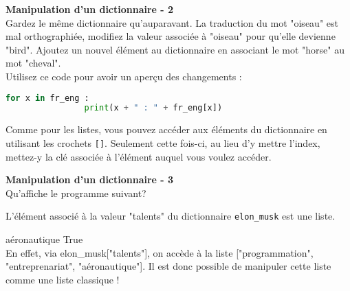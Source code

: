     \begin{Exercice}[5 minutes] \textbf{Manipulation d'un dictionnaire - 2}\\
       Gardez le même dictionnaire qu'auparavant. La traduction du mot "oiseau" est mal orthographiée, modifiez la valeur associée à "oiseau" pour qu'elle devienne "bird". Ajoutez un nouvel élément au dictionnaire en associant le mot "horse" au mot "cheval". \\
       
       Utilisez ce code pour avoir un aperçu des changements : \\
       
       \begin{lstlisting}[language=Python]
            for x in fr_eng :
    			print(x + " : " + fr_eng[x])   \end{lstlisting}
    
        \begin{conseil}
            Comme pour les listes, vous pouvez accéder aux éléments du dictionnaire en utilisant les crochets \lstinline{[]}. Seulement cette fois-ci, au lieu d'y mettre l'index, mettez-y la clé associée à l'élément auquel vous voulez accéder.
        \end{conseil}
        
        \begin{solution}
             
        \end{solution}
    \end{Exercice}
    
    \begin{Exercice}[5 minutes] \textbf{Manipulation d'un dictionnaire - 3}\\
      	Qu'affiche le programme suivant? \\
       
      	 
    
        \begin{conseil}
            L'élément associé à la valeur "talents" du dictionnaire \lstinline{elon_musk} est une liste.
        \end{conseil}
        
        \begin{solution}
            aéronautique 
            True \\
            
            En effet, via elon\_musk["talents"], on accède à la liste ["programmation", "entreprenariat", "aéronautique"]. Il est donc possible de manipuler cette liste comme une liste classique !
        \end{solution}
    \end{Exercice}
    
